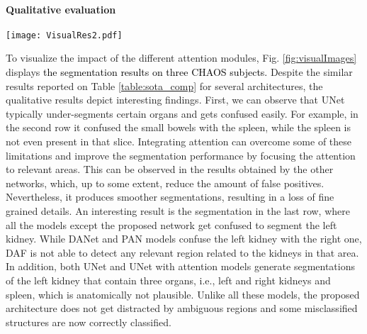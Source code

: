 \documentclass[journal]{IEEEtran}
\begin{document}
\paragraph*{\textbf{Qualitative evaluation}}

\begin{figure*}[h!]
    \centering
    \texttt{[image: VisualRes2.pdf]}
    \caption{Results on \textcolor{black}{three} subjects on the CHAOS Challenge dataset. The proposed multi-scale guided attention network achieves qualitatively better results than other state-of-the-art networks that also integrate attention modules.}
        \label{fig:visualImages}
\end{figure*}


To visualize the impact of the different attention modules,  Fig. \ref{fig:visualImages} displays \textcolor{black}{the segmentation results on three CHAOS subjects.} Despite the similar results reported on Table \ref{table:sota_comp} for several architectures, the qualitative results depict interesting findings. First, we can observe that UNet typically under-segments certain organs and gets confused easily. For example, in the second row it confused the small bowels with the spleen, while the spleen is not even present in that slice. Integrating attention can overcome some of these limitations and improve the segmentation performance by focusing the attention to relevant areas. This can be observed in the results obtained by the other networks, which, up to some extent, reduce the amount of false positives. Nevertheless, it produces smoother segmentations, resulting in a loss of fine grained details. An interesting result is the segmentation in the last row, where all the models except the proposed network get confused to segment the left kidney. While DANet and PAN models confuse the left kidney with the right one, DAF is not able to detect any relevant region related to the kidneys in that area. In addition, both UNet and UNet with attention models generate segmentations of the left kidney that contain three organs, i.e., left and right kidneys and spleen, which is anatomically not plausible. Unlike all these models, the proposed architecture does not get distracted by ambiguous regions and some misclassified structures are now correctly classified. 
\end{document}
